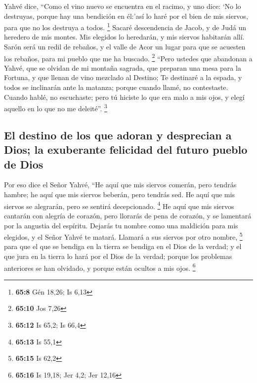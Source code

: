 \begin{paracol}{2}
 Yahvé dice, ``Como el vino nuevo se encuentra en el
racimo, y uno dice: `No lo destruyas, porque hay una bendición en
él:'así lo haré por el bien de mis siervos, para que no los destruya a
todos. \footnote{\textbf{65:8} Gén 18,26; Is 6,13}  Sacaré
descendencia de Jacob, y de Judá un heredero de mis montes. Mis elegidos
lo heredarán, y mis siervos habitarán allí.  Sarón será
un redil de rebaños, y el valle de Acor un lugar para que se acuesten
los rebaños, para mi pueblo que me ha buscado. \footnote{\textbf{65:10}
  Jos 7,26}  ``Pero ustedes que abandonan a Yahvé, que se
olvidan de mi montaña sagrada, que preparan una mesa para la Fortuna, y
que llenan de vino mezclado al Destino;  Te destinaré a
la espada, y todos se inclinarán ante la matanza; porque cuando llamé,
no contestaste. Cuando hablé, no escuchaste; pero tú hiciste lo que era
malo a mis ojos, y elegí aquello en lo que no me deleité''. \footnote{\textbf{65:12}
  Is 65,2; Is 66,4}

\hypertarget{el-destino-de-los-que-adoran-y-desprecian-a-dios-la-exuberante-felicidad-del-futuro-pueblo-de-dios}{%
\subsection{El destino de los que adoran y desprecian a Dios; la
exuberante felicidad del futuro pueblo de
Dios}\label{el-destino-de-los-que-adoran-y-desprecian-a-dios-la-exuberante-felicidad-del-futuro-pueblo-de-dios}}

 Por eso dice el Señor Yahvé, ``He aquí que mis siervos
comerán, pero tendrás hambre; he aquí que mis siervos beberán, pero
tendrás sed. He aquí que mis siervos se alegrarán, pero se sentirá
decepcionado. \footnote{\textbf{65:13} Is 55,1}  He aquí
que mis siervos cantarán con alegría de corazón, pero llorarás de pena
de corazón, y se lamentará por la angustia del espíritu. 
Dejarás tu nombre como una maldición para mis elegidos, y el Señor Yahvé
te matará. Llamará a sus siervos por otro nombre, \footnote{\textbf{65:15}
  Is 62,2}  para que el que se bendiga en la tierra se
bendiga en el Dios de la verdad; y el que jura en la tierra lo hará por
el Dios de la verdad; porque los problemas anteriores se han olvidado, y
porque están ocultos a mis ojos. \footnote{\textbf{65:16} Is 19,18; Jer
  4,2; Jer 12,16}

\hypertarget{la-bienaventuranza-del-pueblo-de-dios-en-los-uxfaltimos-tiempos}{%
}
\end{paracol}
